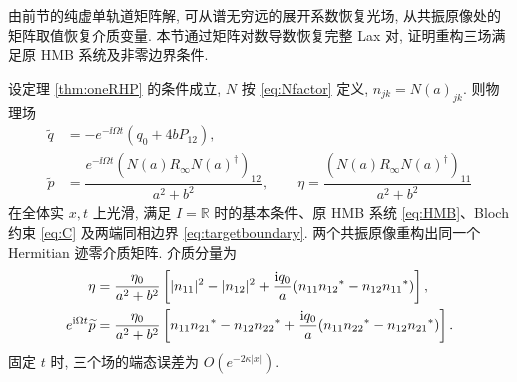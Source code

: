 由前节的纯虚单轨道矩阵解, 可从谱无穷远的展开系数恢复光场, 从共振原像处的矩阵取值恢复介质变量.
本节通过矩阵对数导数恢复完整 Lax 对, 证明重构三场满足原 HMB 系统及非零边界条件.

\begin{theorem}\label{thm:direct-HMB}\label{prop:oneboundary}
设定理 \ref{thm:oneRHP} 的条件成立, $N$ 按 \eqref{eq:Nfactor} 定义, $n_{jk}=N(a)_{jk}$. 则物理场
\begin{equation}\label{eq:finalfields}
\begin{aligned}
\widetilde q&=-e^{-\ii\Omega t}(q_0+4bP_{12}),\\
\widetilde p&=\dfrac{e^{-\ii\Omega t}(N(a)R_\infty N(a)^\dagger)_{12}}{a^2+b^2},\qquad
\eta=\dfrac{(N(a)R_\infty N(a)^\dagger)_{11}}{a^2+b^2}
\end{aligned}
\end{equation}
在全体实 $x,t$ 上光滑, 满足 $I=\mathbb R$ 时的基本条件、原 HMB 系统 \eqref{eq:HMB}、Bloch 约束 \eqref{eq:C} 及两端同相边界 \eqref{eq:targetboundary}. 两个共振原像重构出同一个 Hermitian 迹零介质矩阵. 介质分量为
\begin{align}
\eta&=\dfrac{\eta_0}{a^2+b^2}\left[|n_{11}|^2-|n_{12}|^2
+\dfrac{\mathrm{i} q_0}{a}(n_{11}{n_{12}}^{*}-n_{12}{n_{11}}^{*})\right],\label{eq:etacomponent}\\
e^{\mathrm{i}\Omega t}\widetilde p&=\dfrac{\eta_0}{a^2+b^2}\left[n_{11}{n_{21}}^{*}-n_{12}{n_{22}}^{*}
+\dfrac{\mathrm{i} q_0}{a}(n_{11}{n_{22}}^{*}-n_{12}{n_{21}}^{*})\right].\label{eq:pcomponent}
\end{align}
固定 $t$ 时, 三个场的端态误差为 $O(e^{-2\kappa|x|})$.
\end{theorem}
